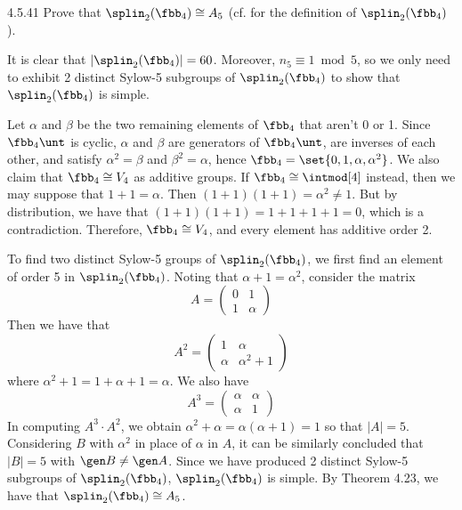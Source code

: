 \begin{exercise}{4.5.41}
	Prove that $\splin_2(\fbb_4) \cong A_5$ (cf.  for the definition of $\splin_2(\fbb_4)$).
\end{exercise}

\begin{sol}
	It is clear that $|\splin_2(\fbb_4)| = 60$.
	Moreover, $n_5 \equiv 1 \bmod 5$, so we only need to exhibit 2 distinct Sylow-5 subgroups of $\splin_2(\fbb_4)$ to show that $\splin_2(\fbb_4)$ is simple.

	Let $\alpha$ and $\beta$ be the two remaining elements of $\fbb_4$ that aren't 0 or 1.
	Since $\fbb_4\unt$ is cyclic, $\alpha$ and $\beta$ are generators of $\fbb_4\unt$, are inverses of each other, and satisfy $\alpha^2 = \beta$ and $\beta^2 = \alpha$, hence $\fbb_4 = \set{0, 1, \alpha, \alpha^2}$.
	We also claim that $\fbb_4 \cong V_4$ as additive groups.
	If $\fbb_4 \cong \intmod[4]$ instead, then we may suppose that $1 + 1 = \alpha$.
	Then $(1 + 1)(1 + 1) = \alpha^2 \neq 1$.
	But by distribution, we have that $(1 + 1)(1 + 1) = 1 + 1 + 1 + 1 = 0$, which is a contradiction.
	Therefore, $\fbb_4 \cong V_4$, and every element has additive order 2.

	To find two distinct Sylow-5 groups of $\splin_2(\fbb_4)$, we first find an element of order 5 in $\splin_2(\fbb_4)$.
	Noting that $\alpha + 1 = \alpha^2$, consider the matrix
	\[
		A =
		\begin{pmatrix}
			0 & 1 \\
			1 & \alpha
		\end{pmatrix}
	\]
	Then we have that
	\[
		A^2 =
		\begin{pmatrix}
			1 & \alpha \\
			\alpha & \alpha^2 + 1
		\end{pmatrix}
	\]
	where $\alpha^2 + 1 = 1 + \alpha + 1 = \alpha$.
	We also have
	\[
		A^3 =
		\begin{pmatrix}
			\alpha & \alpha \\
			\alpha & 1
		\end{pmatrix}
	\]
	In computing $A^3 \cdot A^2$, we obtain $\alpha^2 + \alpha = \alpha(\alpha + 1) = 1$ so that $|A| = 5$.
	Considering $B$ with $\alpha^2$ in place of $\alpha$ in $A$, it can be similarly concluded that $|B| = 5$ with $\gen B \neq \gen A$.
	Since we have produced 2 distinct Sylow-5 subgroups of $\splin_2(\fbb_4)$, $\splin_2(\fbb_4)$ is simple.
	By Theorem 4.23, we have that $\splin_2(\fbb_4) \cong A_5$.
\end{sol}


